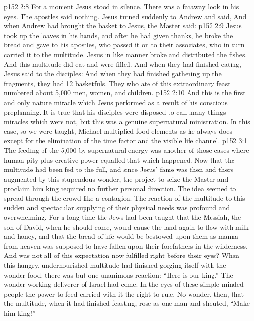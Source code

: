 \vs p152 2:8 For a moment Jesus stood in silence. There was a faraway look in his eyes. The apostles said nothing. Jesus turned suddenly to Andrew and said,  And when Andrew had brought the basket to Jesus, the Master said: 
\vs p152 2:9 Jesus took up the loaves in his hands, and after he had given thanks, he broke the bread and gave to his apostles, who passed it on to their associates, who in turn carried it to the multitude. Jesus in like manner broke and distributed the fishes. And this multitude did eat and were filled. And when they had finished eating, Jesus said to the disciples:  And when they had finished gathering up the fragments, they had 12 basketfuls. They who ate of this extraordinary feast numbered about 5,000 men, women, and children.
\vs p152 2:10 \pc And this is the first and only nature miracle which Jesus performed as a result of his conscious preplanning. It is true that his disciples were disposed to call many things miracles which were not, but this was a genuine supernatural ministration. In this case, so we were taught, Michael multiplied food elements as he always does except for the elimination of the time factor and the visible life channel.
\vs p152 3:1 The feeding of the 5,000 by supernatural energy was another of those cases where human pity plus creative power equalled that which happened. Now that the multitude had been fed to the full, and since Jesus’ fame was then and there augmented by this stupendous wonder, the project to seize the Master and proclaim him king required no further personal direction. The idea seemed to spread through the crowd like a contagion. The reaction of the multitude to this sudden and spectacular supplying of their physical needs was profound and overwhelming. For a long time the Jews had been taught that the Messiah, the son of David, when he should come, would cause the land again to flow with milk and honey, and that the bread of life would be bestowed upon them as manna from heaven was supposed to have fallen upon their forefathers in the wilderness. And was not all of this expectation now fulfilled right before their eyes? When this hungry, undernourished multitude had finished gorging itself with the wonder\hyp{}food, there was but one unanimous reaction: “Here is our king.” The wonder\hyp{}working deliverer of Israel had come. In the eyes of these simple\hyp{}minded people the power to feed carried with it the right to rule. No wonder, then, that the multitude, when it had finished feasting, rose as one man and shouted, “Make him king!”
